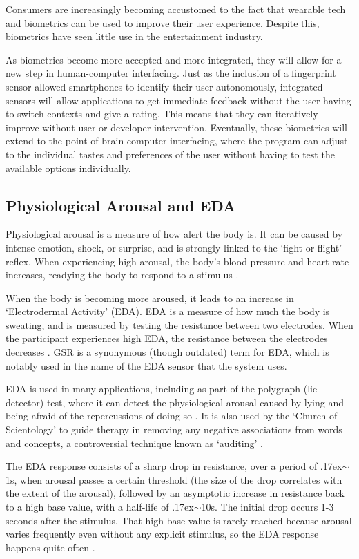 \documentclass[12pt,a4paper]{article}
\begin{document}
Consumers are increasingly becoming accustomed to the fact that wearable tech and biometrics can be used to improve their user experience. Despite this, biometrics have seen little use in the entertainment industry.

As biometrics become more accepted and more integrated, they will allow for a new step in human-computer interfacing. Just as the inclusion of a fingerprint sensor allowed smartphones to identify their user autonomously, integrated sensors will allow applications to get immediate feedback without the user having to switch contexts and give a rating. This means that they can iteratively improve without user or developer intervention. Eventually, these biometrics will extend to the point of brain-computer interfacing, where the program can adjust to the individual tastes and preferences of the user without having to test the available options individually.

\subsection{Physiological Arousal and EDA}
Physiological arousal is a measure of how alert the body is. It can be caused by intense emotion, shock, or surprise, and is strongly linked to the `fight or flight' reflex. When experiencing high arousal, the body's blood pressure and heart rate increases, readying the body to respond to a stimulus \cite[pp.162-167]{arousal}.

When the body is becoming more aroused, it leads to an increase in `Electrodermal Activity' (EDA). EDA is a measure of how much the body is sweating, and is measured by testing the resistance between two electrodes. When the participant experiences high EDA, the resistance between the electrodes decreases \cite[pp.2-3]{eda}. GSR is a synonymous (though outdated) term for EDA, which is notably used in the name of the EDA sensor that the system uses.

EDA is used in many applications, including as part of the polygraph (lie-detector) test, where it can detect the physiological arousal caused by lying and being afraid of the repercussions of doing so \cite{polygraph}. It is also used by the `Church of Scientology' to guide therapy in removing any negative associations from words and concepts, a controversial technique known as `auditing' \cite[p.32]{auditing}.

The EDA response consists of a sharp drop in resistance, over a period of {\raise.17ex\hbox{$\scriptstyle\sim$}}1s, when arousal passes a certain threshold (the size of the drop correlates with the extent of the arousal), followed by an asymptotic increase in resistance back to a high base value, with a half-life of {\raise.17ex\hbox{$\scriptstyle\sim$}}10s. The initial drop occurs 1-3 seconds after the stimulus. That high base value is rarely reached because arousal varies frequently even without any explicit stimulus, so the EDA response happens quite often \cite{edaAnalysis}.
\end{document}
